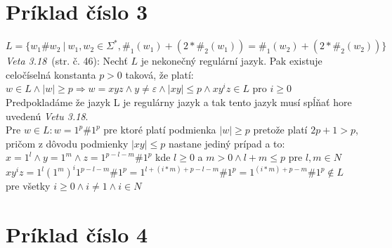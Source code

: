 \documentclass[11pt,a4paper]{article}
\begin{document}
\newpage
\section{Príklad číslo 3}
$L = \{ w_1\#w_2\ |\ w_1,w_2 \in \Sigma^*, \#_1(w_1) + (2 * \#_2(w_1)) = \#_1(w_2) + (2 * \#_2(w_2))\}$\\

\textit{Veta 3.18}~\cite{TIN}(str. č. 46): Nechť $L$ je nekonečný regulární jazyk. Pak existuje celočíselná konstanta $p>0$ taková, že platí: $w \in L \wedge |w| \geq p \Rightarrow w = xyz \wedge y \neq \varepsilon \wedge |xy| \leq p \wedge xy^iz \in L$ pro $i \geq 0$\\

Predpokladáme že jazyk L je regulárny jazyk a tak tento jazyk musí spĺňať hore uvedenú \textit{Vetu 3.18}.\\

Pre $w \in L: w=1^p\#1^p$ pre ktoré platí podmienka $|w| \geq p$ pretože platí $2p+1>p$, pričom z dôvodu podmienky $|xy| \leq p$ nastane jediný prípad a to:\\

$x=1^l \wedge y=1^m \wedge z=1^{p-l-m}\#1^p$ kde $l \geq 0$ a $m > 0 \wedge l+m \leq p$ pre $l,m \in N$\\

$xy^iz = 1^l(1^{m})^i1^{p-l-m}\#1^p = 1^{l+(i*m)+p-l-m}\#1^p = 1^{(i*m)+p-m}\#1^p \notin L$ pre všetky $i \geq 0 \wedge i \neq 1 \wedge i \in N$\\

\section{Príklad číslo 4}
\end{document}
